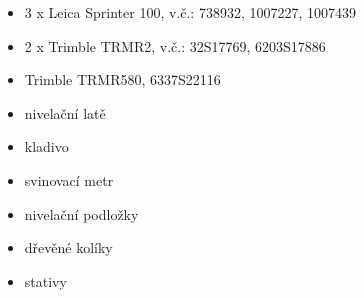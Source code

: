 \begin{itemize}
    \item 3 x Leica Sprinter 100, v.č.: 738932, 1007227, 1007439
    \item 2 x Trimble TRMR2, v.č.: 32S17769, 6203S17886
    \item Trimble TRMR580, 6337S22116
    \item nivelační latě
    \item kladivo
    \item svinovací metr
    \item nivelační podložky
    \item dřevěné kolíky
    \item stativy
\end{itemize}

